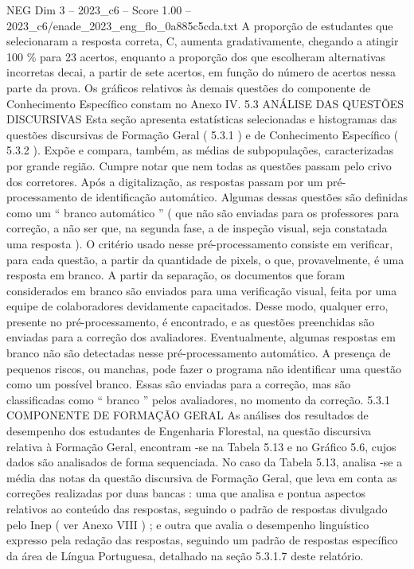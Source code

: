 \begin{textsample}{NEG Dim 3 – 2023\_c6 – Score 1.00 – 2023\_c6/enade\_2023\_eng\_flo\_0a885c5cda.txt}
A proporção de estudantes que selecionaram a resposta correta, C, aumenta gradativamente, chegando a atingir 100 \% para 23 acertos, enquanto a proporção dos que escolheram alternativas incorretas decai, a partir de sete acertos, em função do número de acertos nessa parte da prova.
Os gráficos relativos às demais questões do componente de Conhecimento Específico constam no Anexo IV. 5.3 ANÁLISE DAS QUESTÕES DISCURSIVAS Esta seção apresenta estatísticas selecionadas e histogramas das questões discursivas de Formação Geral ( 5.3.1 ) e de Conhecimento Específico ( 5.3.2 ).
Expõe e compara, também, as médias de subpopulações, caracterizadas por grande região.
Cumpre notar que nem todas as questões passam pelo crivo dos corretores.
Após a digitalização, as respostas passam por um pré-processamento de identificação automático.
Algumas dessas questões são definidas como um “ branco automático ” ( que não são enviadas para os professores para correção, a não ser que, na segunda fase, a de inspeção visual, seja constatada uma resposta ).
O critério usado nesse pré-processamento consiste em verificar, para cada questão, a partir da quantidade de pixels, o que, provavelmente, é uma resposta em branco.
A partir da separação, os documentos que foram considerados em branco são enviados para uma verificação visual, feita por uma equipe de colaboradores devidamente capacitados.
Desse modo, qualquer erro, presente no pré-processamento, é encontrado, e as questões preenchidas são enviadas para a correção dos avaliadores.
Eventualmente, algumas respostas em branco não são detectadas nesse pré-processamento automático.
A presença de pequenos riscos, ou manchas, pode fazer o programa não identificar uma questão como um possível branco.
Essas são enviadas para a correção, mas são classificadas como “ branco ” pelos avaliadores, no momento da correção. 5.3.1 COMPONENTE DE FORMAÇÃO GERAL As análises dos resultados de desempenho dos estudantes de Engenharia Florestal, na questão discursiva relativa à Formação Geral, encontram -se na Tabela 5.13 e no Gráfico 5.6, cujos dados são analisados de forma sequenciada.
No caso da Tabela 5.13, analisa -se a média das notas da questão discursiva de Formação Geral, que leva em conta as correções realizadas por duas bancas : uma que analisa e pontua aspectos relativos ao conteúdo das respostas, seguindo o padrão de respostas divulgado pelo Inep ( ver Anexo VIII ) ; e outra que avalia o desempenho linguístico expresso pela redação das respostas, seguindo um padrão de respostas específico da área de Língua Portuguesa, detalhado na seção 5.3.1.7 deste relatório.

\end{textsample}
